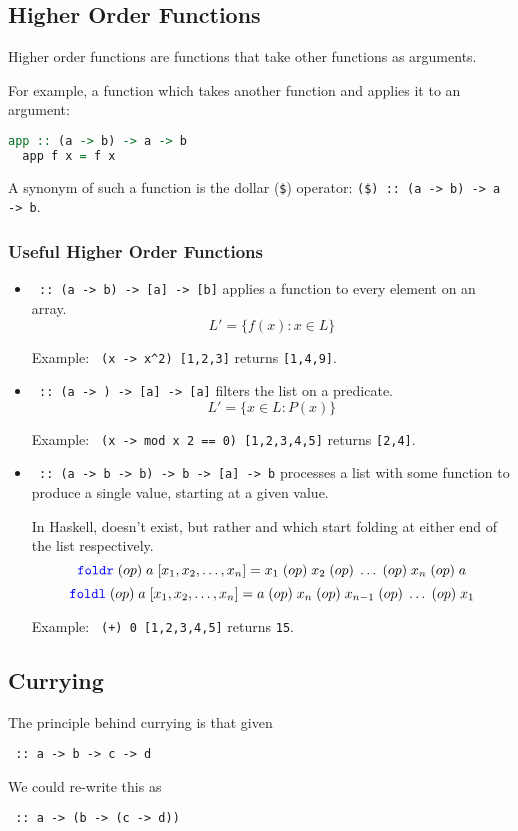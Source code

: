 \subsection{Higher Order Functions}
Higher order functions are functions that take other functions as arguments.

For example, a function which takes another function and applies it to an argument:
\begin{lstlisting}[language=haskell]
  app :: (a -> b) -> a -> b
  app f x = f x
\end{lstlisting}
A synonym of such a function is the dollar (\texttt{\$}) operator: \texttt{(\$) :: (a -> b) -> a -> b}.

\subsubsection{Useful Higher Order Functions}
\begin{itemize}
  \item \texttt{ :: (a -> b) -> [a] -> [b]} applies a function to every element on an array.
  \[L' = \{f(x) : x \in L\}\]
  
  Example: \texttt{ (x -> x\string^2) [1,2,3]} returns \texttt{[1,4,9]}.
  \item \texttt{ :: (a -> ) -> [a] -> [a]} filters the list on a predicate.
  \[L' = \{x \in L : P(x)\}\]
  
  Example: \texttt{ (x -> mod x 2 == 0) [1,2,3,4,5]} returns \texttt{[2,4]}.
  \item \texttt{ :: (a -> b -> b) -> b -> [a] -> b} processes a list with some function to produce a single value, starting at a given value.
  
  In Haskell, \texttt{} doesn't exist, but rather \texttt{} and \texttt{} which start folding at either end of the list respectively.
  \[\texttt{\textcolor{blue}{foldr}}\; (op)\; a\; [x_1, x_2, \ldots, x_n] = x_1\; (op)\; x_2\; (op)\; \ldots\; (op)\; x_n\; (op)\; a\]
  \[\texttt{\textcolor{blue}{foldl}}\; (op)\; a\; [x_1, x_2, \ldots, x_n] = a\; (op)\; x_n\; (op)\; x_{n-1}\; (op)\; \ldots\; (op)\; x_1\]

  Example: \texttt{ (+) 0 [1,2,3,4,5]} returns \texttt{15}.
\end{itemize}

\subsection{Currying}
The principle behind currying is that given
\begin{center}
  \texttt{ :: a -> b -> c -> d}
\end{center}
We could re-write this as
\begin{center}
  \texttt{ :: a -> (b -> (c -> d))}
\end{center}

